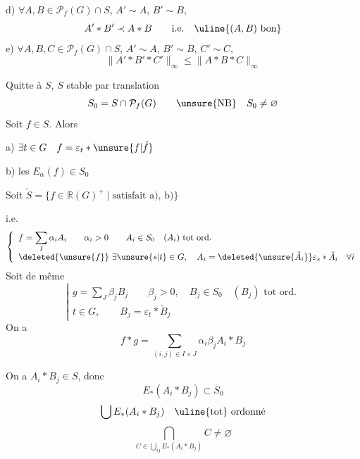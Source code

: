 
d) $\forall A,B\in\mathcal P_f(G)\cap S$, $A'\sim A$, $B'\sim B$, \unsure{$\ldots$}
\[
A'\ast B'\prec A\ast B\qquad\text{i.e.}\quad\uline{(A,B)\text{ bon}}
\]
e) $\forall A,B,C\in\mathcal P_f(G)\cap S$, $A'\sim A$, $B'\sim B$, $C'\sim C$, \unsure{$\ldots$}
\[
\|A'\ast B'\ast C'\|_\infty\leq\|A\ast B\ast C\|_\infty
\]


Quitte à  $S$,  $S$ stable par translation
\[
S_0=S\cap\mathcal P_f(G)\qquad\unsure{\text{NB}}\quad S_0\ne\varnothing
\]
Soit $f\in S$. Alors

a) $\exists t\in G\quad f=\varepsilon_t\ast\unsure{f|\check f}$

b) les $E_\alpha(f)\in S_0$


Soit  $\tilde S=\{f\in\mathbb R(G)^+\mid\text{satisfait a), b)}\}$

 i.e.
\[
\left\{\begin{array}{l}
f=\displaystyle\sum_I\alpha_i A_i\qquad\alpha_i>0\qquad A_i\in S_0\quad(A_i)\text{ tot ord.}\\
\deleted{\unsure{f}}\ \exists\unsure{s|t}\in G,\quad A_i=\deleted{\unsure{\check A_i}}\varepsilon_s\ast\check A_i\quad\forall i
\end{array}\right.
\]
Soit de même
\[
\left|\begin{array}{l}
g=\displaystyle\sum_J\beta_j B_j\qquad\beta_j>0,\quad B_j\in S_0\quad(B_j)\text{ tot ord.}\\
t\in G,\qquad B_j=\varepsilon_t\ast\check B_j
\end{array}\right.
\]
On a
\[
f\ast g=\sum_{(i,j)\in I\times J}\alpha_i\beta_j A_i\ast B_j
\]


On a $A_i\ast B_j\in S$, donc
\[
E_\ast(A_i\ast B_j)\subset S_0
\]
\[
\bigcup E_\ast(A_i\ast B_j)\quad\uline{\text{tot}}\text{ ordonné}
\]
\[
\bigcap_{C\in\bigcup_{ij}E_\ast(A_i\ast B_j)}C\ne\varnothing
\]
